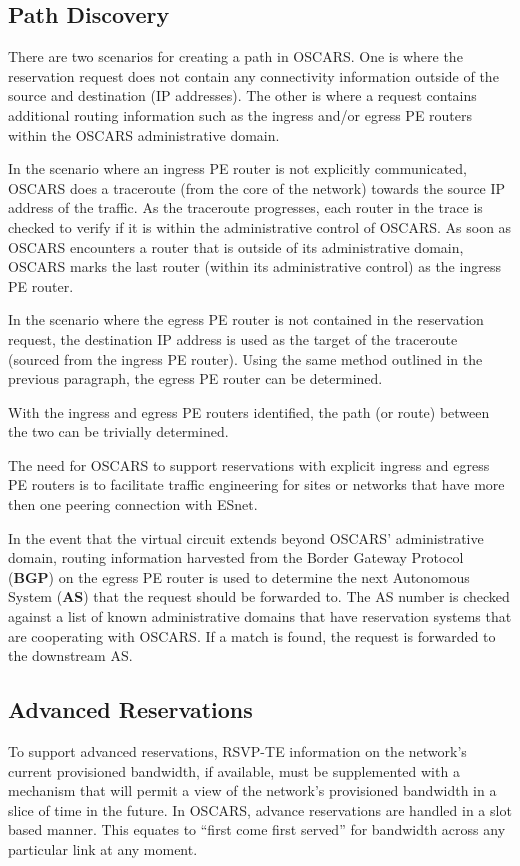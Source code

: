 \documentclass[conference]{IEEEtran}
\begin{document}
\subsection{Path Discovery}
There are two scenarios for creating a path in OSCARS.  One is where the
reservation request does not contain any connectivity information outside of
the source and destination (IP addresses).  The other is where a request
contains additional routing information such as the ingress and/or egress 
PE routers within the OSCARS administrative domain.

In the scenario where an ingress PE router is not explicitly communicated, 
OSCARS does a traceroute (from the core of the network) towards the source IP 
address of the traffic. As the traceroute
progresses, each router in the trace is checked to verify if 
it is within the administrative control of OSCARS. As soon as OSCARS 
encounters a router that
is outside of its administrative domain, OSCARS marks the last router (within 
its administrative control) as the ingress PE router.

In the scenario where the egress PE router is not contained in the reservation 
request, 
the destination IP address is used as the target of the traceroute (sourced 
from the ingress PE router).
Using the same method outlined in the previous paragraph, the egress PE router 
can be determined.

With the ingress and egress PE routers identified, the path (or route) between 
the two can be trivially determined.

The need for OSCARS to support reservations with explicit ingress and egress PE
routers is to
facilitate traffic engineering for sites or networks that have more then one 
peering connection with ESnet.

In the event that the virtual circuit extends beyond OSCARS' administrative 
domain,
routing information harvested from the Border Gateway Protocol 
(\textbf{BGP}) on the egress PE router is used to determine the next
Autonomous System (\textbf{AS}) that the request should be forwarded 
to.   The AS number is
checked against a list of known administrative domains that have reservation 
systems
that are cooperating with OSCARS.  If a match is found, the request is 
forwarded to the downstream AS.

\subsection{Advanced Reservations }
To support advanced reservations, RSVP-TE information on the network's current
provisioned bandwidth, if available, must be supplemented with a mechanism 
that will permit a view of the network's provisioned bandwidth in a slice of
time in the future.  In OSCARS, advance reservations are handled in a slot 
based manner.  This equates to ``first come first served'' for bandwidth across
any particular link at any moment.
\end{document}
